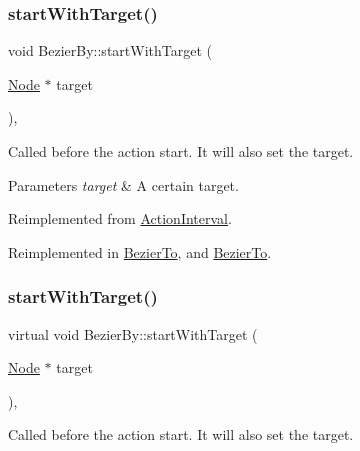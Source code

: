 \subsubsection{\texorpdfstring{start\+With\+Target()}{startWithTarget()}\hspace{0.1cm}{\footnotesize\ttfamily [1/2]}}
{\footnotesize\ttfamily void Bezier\+By\+::start\+With\+Target (\begin{DoxyParamCaption}\item[{\hyperlink{classNode}{Node} $\ast$}]{target }\end{DoxyParamCaption})\hspace{0.3cm}{\ttfamily [override]}, {\ttfamily [virtual]}}

Called before the action start. It will also set the target.


\begin{DoxyParams}{Parameters}
{\em target} & A certain target. \\
\hline
\end{DoxyParams}


Reimplemented from \hyperlink{classActionInterval_ad3d91186b2c3108488ddbbdbbd982484}{Action\+Interval}.



Reimplemented in \hyperlink{classBezierTo_a0afa7e2b008c5d8f8a63d559face86a3}{Bezier\+To}, and \hyperlink{classBezierTo_ad45e47e3da2159e77c5b82fa1b6b2b1a}{Bezier\+To}.

\mbox{\label{classBezierBy_af09cb1b4ced8b91c0e87f74bf844427b}} 
\subsubsection{\texorpdfstring{start\+With\+Target()}{startWithTarget()}\hspace{0.1cm}{\footnotesize\ttfamily [2/2]}}
{\footnotesize\ttfamily virtual void Bezier\+By\+::start\+With\+Target (\begin{DoxyParamCaption}\item[{\hyperlink{classNode}{Node} $\ast$}]{target }\end{DoxyParamCaption})\hspace{0.3cm}{\ttfamily [override]}, {\ttfamily [virtual]}}

Called before the action start. It will also set the target.


